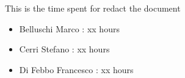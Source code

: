 This is the time spent for redact the document
\begin{itemize}
	\item Belluschi Marco : xx hours
	\item Cerri Stefano : xx hours
	\item Di Febbo Francesco : xx hours
\end{itemize}